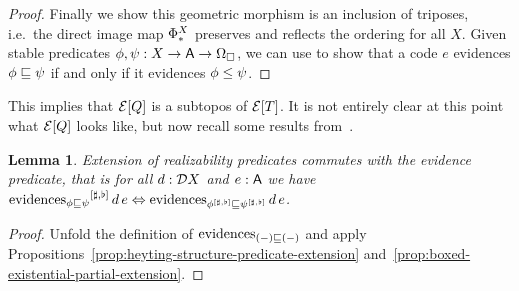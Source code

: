 \documentclass[11pt]{article}
\newtheorem{lemm}[thrm]{Lemma}
\begin{document}
\begin{proof}

  Finally we show this geometric morphism is an inclusion of triposes, i.e.\ the
  direct image map \(\Phi_\ast^{X}\) preserves and reflects the ordering for all
  \(X\).
  Given stable predicates \(\phi,\psi : {{X}\to{{{\ensuremath{\mathsf{A}}}\to{\Omega_\Box}}}}\), we can use
   to show that a code \(e\) evidences
  \({\phi}\sqsubseteq{\psi}\) if and only if it evidences \({\phi}\leq{\psi}\).
\end{proof}

This implies that \({\mathcal{E}}[{Q}]\) is a subtopos of \({\mathcal{E}}[{T}]\).
%
It is not entirely clear at this point what \({\mathcal{E}}[{Q}]\) looks like,
but now recall some results
from~\cite[\S6.3]{vanoostenExercisesRealizability2018}.

\begin{lemm}\label{prop:vo-extension-of-evidence-predicate}
  Extension of realizability predicates commutes with the evidence
  predicate, that is for all \(d:\mathcal{D}{X}\) and \(e:\mathsf{A}\) we have
  \(
    {\text{evidences}_{{\phi}\sqsubseteq{\psi}}}^{[{\sharp,\flat}]}\,d\,e
    \Leftrightarrow
    \text{evidences}_{{{\phi}^{[{\sharp,\flat}]}}\sqsubseteq{{\psi}^{[{\sharp,\flat}]}}}\,d\,e
  \).
\end{lemm}
\begin{proof}
  Unfold the definition of \(\text{evidences}_{{(-)}\sqsubseteq{(-)}}\) and apply
  Propositions~\ref{prop:heyting-structure-predicate-extension}
  and~\ref{prop:boxed-existential-partial-extension}.
\end{proof}
\end{document}
